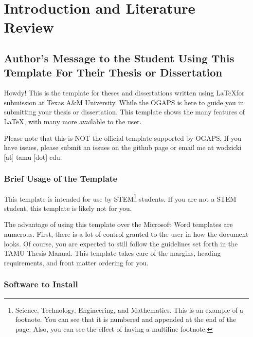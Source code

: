 

\chapter{Introduction and Literature Review}

\section{Author's Message to the Student Using This Template For Their Thesis or Dissertation}

Howdy! This is the template for theses and dissertations written using \LaTeX for submission at Texas A\&M University. While the \ac{OGAPS} is here to guide you in submitting your thesis or dissertation. This template shows the many features of \LaTeX, with many more available to the user.

Please note that this is NOT the official template supported by \ac{OGAPS}. If you have issues, please submit an issues on the github page or email me at wodzicki [at] tamu [dot] edu.


\subsection{Brief Usage of the Template}

This template is intended for use by STEM\footnote{Science, Technology, Engineering, and Mathematics. This is an example of a footnote. You can see that it is numbered and appended at the end of the page. Also, you can see the effect of having a multiline footnote.} students. If you are not a STEM student, this template is likely not for you.

The advantage of using this template over the Microsoft Word templates are numerous. First, there is a lot of control granted to the user in how the document looks. Of course, you are expected to still follow the guidelines set forth in the TAMU Thesis Manual. This template takes care of the margins, heading requirements, and front matter ordering for you.


\subsection*{Software to Install}


